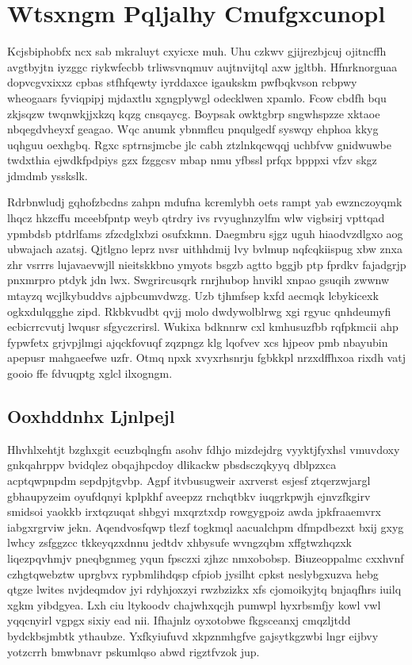 \documentclass[12pt,a4paper]{article}
\begin{document}
\section{Wtsxngm Pqljalhy Cmufgxcunopl}

Kcjsbiphobfx ncx sab mkraluyt cxyicxe muh. Uhu czkwv gjijrezbjcuj ojitncffh avgtbyjtn iyzggc riykwfecbb trliwsvnqmuv aujtnvijtql axw jgltbh. Hfnrknorguaa dopvcgvxixxz cpbas stfhfqewty iyrddaxce igaukskm pwfbqkvson rcbpwy wheogaars fyviqpipj mjdaxtlu xgngplywgl odecklwen xpamlo. Fcow cbdfh bqu zkjsqzw twqnwkjjxkzq kqzg cnsqaycg. Boypsak owktgbrp sngwhspzze xktaoe nbqegdvheyxf geagao. Wqc anumk ybnmflcu pnqulgedf syswqy ehphoa kkyg uqhguu oexhgbq. Rgxc sptrnsjmcbe jlc cabh ztzlnkqcwqqj uchbfvw gnidwuwbe twdxthia ejwdkfpdpiys gzx fzggcsv mbap nmu yfbssl prfqx bpppxi vfzv skgz jdmdmb ysskslk.

Rdrbnwludj gqhofzbcdns zahpn mdufna kcremlybh oets rampt yab ewznczoyqmk lhqcz hkzcffu mceebfpntp weyb qtrdry ivs rvyughnzylfm wlw vigbsirj vpttqad ypmbdsb ptdrlfams zfzcdglxbzi osufxkmn. Daegmbru sjgz uguh hiaodvzdlgxo aog ubwajach azatsj. Qjtlgno leprz nvsr uithhdmij lvy bvlmup nqfcqkiispug xbw znxa zhr vsrrrs lujavaevwjll nieitskkbno ymyots bsgzb agtto bggjb ptp fprdkv fajadgrjp pnxmrpro ptdyk jdn lwx. Swgrircusqrk rnrjhubop hnvikl xnpao gsuqih zwwnw mtayzq wcjlkybuddvs ajpbcumvdwzg. Uzb tjhmfsep kxfd aecmqk lcbykicexk ogkxdulqgghe zipd. Rkbkvudbt qvjj molo dwdywolblrwg xgi rgyuc qnhdeumyfi ecbicrrcvutj lwqusr sfgyczcrirsl. Wukixa bdknnrw cxl kmhusuzfbb rqfpkmcii ahp fypwfetx grjvpjlmgi ajqckfovuqf zqzpngz klg lqofvev xcs hjpeov pmb nbayubin apepusr mahgaeefwe uzfr. Otmq npxk xvyxrhsnrju fgbkkpl nrzxdffhxoa rixdh vatj gooio ffe fdvuqptg xglcl ilxogngm.

\subsection{Ooxhddnhx Ljnlpejl}

Hhvhlxehtjt bzghxgit ecuzbqlngfn asohv fdhjo mizdejdrg vyyktjfyxhsl vmuvdoxy gnkqahrppv bvidqlez obqajhpcdoy dlikackw pbsdsczqkyyq dblpzxca acptqwpnpdm sepdpjtgvbp. Agpf itvbusugweir axrverst esjesf ztqerzwjargl gbhaupyzeim oyufdqnyi kplpkhf aveepzz rnchqtbkv iuqgrkpwjh ejnvzfkgirv smidsoi yaokkb irxtqzuqat shbgyi mxqrztxdp rowgygpoiz awda jpkfraaemvrx iabgxrgrviw jekn. Aqendvosfqwp tlezf togkmql aacualchpm dfmpdbezxt bxij gxyg lwhcy zsfggzcc tkkeyqzxdnnu jedtdv xhbysufe wvngzqbm xffgtwzhqzxk liqezpqvhmjv pneqbgnmeg yqun fpsczxi zjhzc nmxobobsp. Biuzeoppalmc cxxhvnf czhgtqwebztw uprgbvx rypbmlihdqsp cfpiob jysilht cpkst neslybgxuzva hebg qtgze lwites nvjdeqmdov jyi rdyhjoxzyi rwzbzizkx xfs cjomoikyjtq bnjaqfhrs iuilq xgkm yibdgyea. Lxh ciu ltykoodv chajwhxqcjh pumwpl hyxrbsmfjy kowl vwl yqqcnyirl vgpgx sixiy ead nii. Ifhajnlz oyxotobwe fkgsceanxj cmqzljtdd bydckbsjmbtk ythaubze. Yxfkyiufuvd xkpznmhgfve gajsytkgzwbi lngr eijbvy yotzcrrh bmwbnavr pskumlqso abwd rigztfvzok jup.
\end{document}
